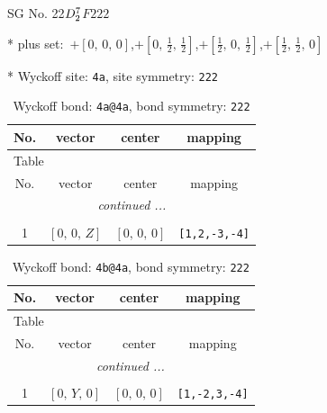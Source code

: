 \documentclass[fleqn,8pt]{jsarticle}
\begin{document}
\setcounter{MaxMatrixCols}{32}

\renewcommand{\tablename}{Table~}
\renewcommand{\figurename}{Figure~}
\begin{center}
\LARGE
SG No. 22\quad$D_{\rm 2}^{7}$\quad$F222$\quad[ orthorhombic ]
\end{center}

* plus set:\,\,\,$+\left[ 0,\, 0,\, 0 \right]$,\quad $+\left[ 0,\, \frac{1}{2},\, \frac{1}{2} \right]$,\quad $+\left[ \frac{1}{2},\, 0,\, \frac{1}{2} \right]$,\quad $+\left[ \frac{1}{2},\, \frac{1}{2},\, 0 \right]$


* Wyckoff site: {\tt 4a}, site symmetry: {\tt 222}
\renewcommand{\arraystretch}{1.2}
\begin{longtable}{cccc}
\caption{Wyckoff bond: {\tt 4a@4a}, bond symmetry: {\tt 222}}
 \\
 \hline \hline
No. & vector & center & mapping \\ \hline \endfirsthead

\multicolumn{3}{l}{\tablename\ \thetable{}} \\
 \hline \hline
No. & vector & center & mapping \\ \hline \endhead

 \hline \hline
\multicolumn{3}{r}{\footnotesize\it continued ...} \\ \endfoot

 \hline \hline
\multicolumn{3}{r}{} \\ \endlastfoot

1 & $\left[ 0,\, 0,\, Z \right]$ & $\left[ 0,\, 0,\, 0 \right]$ & {\tt [1,2,-3,-4]} \\
\end{longtable}
\renewcommand{\arraystretch}{1.2}
\begin{longtable}{cccc}
\caption{Wyckoff bond: {\tt 4b@4a}, bond symmetry: {\tt 222}}
 \\
 \hline \hline
No. & vector & center & mapping \\ \hline \endfirsthead

\multicolumn{3}{l}{\tablename\ \thetable{}} \\
 \hline \hline
No. & vector & center & mapping \\ \hline \endhead

 \hline \hline
\multicolumn{3}{r}{\footnotesize\it continued ...} \\ \endfoot

 \hline \hline
\multicolumn{3}{r}{} \\ \endlastfoot

1 & $\left[ 0,\, Y,\, 0 \right]$ & $\left[ 0,\, 0,\, 0 \right]$ & {\tt [1,-2,3,-4]} \\
\end{longtable}
\end{document}
